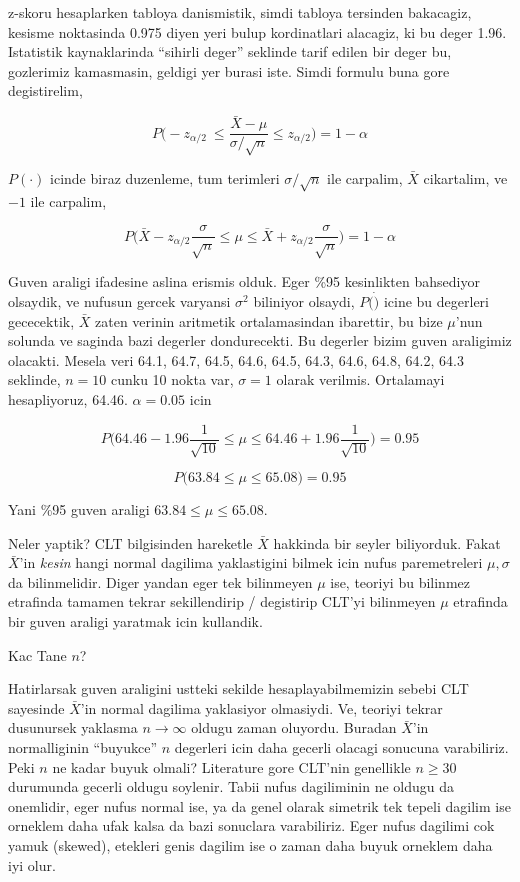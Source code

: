 \documentclass[12pt,fleqn]{article}\usepackage{../common}
\begin{document}
z-skoru hesaplarken tabloya danismistik, simdi tabloya tersinden bakacagiz,
kesisme noktasinda 0.975 diyen yeri bulup kordinatlari alacagiz, ki bu
deger 1.96. Istatistik kaynaklarinda ``sihirli deger'' seklinde tarif
edilen bir deger bu, gozlerimiz kamasmasin, geldigi yer burasi iste. Simdi
formulu buna gore degistirelim,

$$ 
P \bigg( 
-z_{\alpha/2} \
\le \frac{\bar{X} - \mu}{\sigma / \sqrt{n}} 
\le z_{\alpha/2}
\bigg) = 1-\alpha
 $$

$P(\cdot)$ icinde biraz duzenleme, tum terimleri $\sigma / \sqrt{n}$ ile
carpalim, $\bar{X}$ cikartalim, ve $-1$ ile carpalim,

$$ 
P \bigg( 
\bar{X} - z_{\alpha/2}\frac{\sigma}{\sqrt{n}}
\le \mu
\le \bar{X} + z_{\alpha/2}\frac{\sigma}{\sqrt{n}}
\bigg) = 1-\alpha
 $$

Guven araligi ifadesine aslina erismis olduk. Eger \%95 kesinlikten
bahsediyor olsaydik, ve nufusun gercek varyansi $\sigma^2$ biliniyor
olsaydi, $P(\dot)$ icine bu degerleri gececektik, $\bar{X}$ zaten verinin
aritmetik ortalamasindan ibarettir, bu bize $\mu$'nun solunda ve saginda
bazi degerler dondurecekti. Bu degerler bizim guven araligimiz
olacakti. Mesela veri 64.1, 64.7, 64.5, 64.6, 64.5, 64.3, 64.6, 64.8,
64.2, 64.3 seklinde, $n=10$ cunku 10 nokta var, $\sigma = 1$ olarak
verilmis.  Ortalamayi hesapliyoruz, 64.46. $\alpha=0.05$ icin

$$ 
P \bigg( 
64.46 - 1.96\frac{1}{\sqrt{10}}
\le \mu
\le 64.46 + 1.96\frac{1}{\sqrt{10}}
\bigg) = 0.95
 $$

$$ P\bigg(63.84 \le \mu \le 65.08\bigg) = 0.95 $$

Yani \%95 guven araligi $63.84 \le \mu \le 65.08$. 

Neler yaptik? CLT bilgisinden hareketle $\bar{X}$ hakkinda bir seyler
biliyorduk. Fakat $\bar{X}$'in {\em kesin} hangi normal dagilima
yaklastigini bilmek icin nufus paremetreleri $\mu,\sigma$ da
bilinmelidir. Diger yandan eger tek bilinmeyen $\mu$ ise, teoriyi bu
bilinmez etrafinda tamamen tekrar sekillendirip / degistirip CLT'yi
bilinmeyen $\mu$ etrafinda bir guven araligi yaratmak icin kullandik.

Kac Tane $n$?

Hatirlarsak guven araligini ustteki sekilde hesaplayabilmemizin sebebi CLT
sayesinde $\bar{X}$'in normal dagilima yaklasiyor olmasiydi. Ve, teoriyi
tekrar dusunursek yaklasma $n \to \infty$ oldugu zaman oluyordu. Buradan
$\bar{X}$'in normalliginin ``buyukce'' $n$ degerleri icin daha gecerli
olacagi sonucuna varabiliriz. Peki $n$ ne kadar buyuk olmali?  Literature
gore CLT'nin genellikle $n \ge 30$ durumunda gecerli oldugu soylenir. Tabii
nufus dagiliminin ne oldugu da onemlidir, eger nufus normal ise, ya da
genel olarak simetrik tek tepeli dagilim ise orneklem daha ufak kalsa da
bazi sonuclara varabiliriz. Eger nufus dagilimi cok yamuk (skewed),
etekleri genis dagilim ise o zaman daha buyuk orneklem daha iyi olur.
\end{document}
